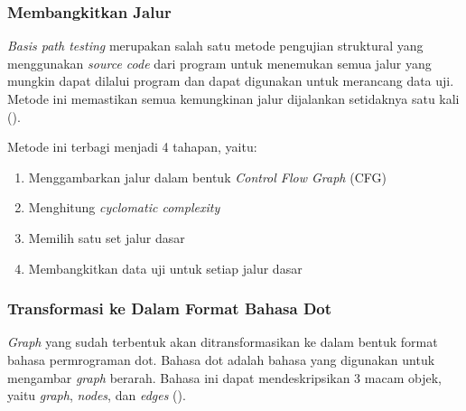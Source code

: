\subsubsection*{Membangkitkan Jalur}
\textit{Basis path testing} merupakan salah satu metode pengujian struktural yang menggunakan \textit{source code} dari program untuk menemukan semua jalur yang mungkin dapat dilalui program dan dapat digunakan untuk merancang data uji. Metode ini memastikan semua kemungkinan jalur dijalankan setidaknya satu kali (\cite{BASU2015}). 

Metode ini terbagi menjadi 4 tahapan, yaitu:
\begin{enumerate}[noitemsep] 
	\item Menggambarkan jalur dalam bentuk \textit{ Control Flow Graph} (CFG)
	\item Menghitung \textit{cyclomatic complexity}
	\item Memilih satu set jalur dasar
	\item Membangkitkan data uji untuk setiap jalur dasar
\end{enumerate}


\subsubsection*{Transformasi ke Dalam Format Bahasa Dot}
\textit{Graph} yang sudah terbentuk akan ditransformasikan ke dalam bentuk format bahasa permrograman dot. Bahasa dot adalah bahasa yang digunakan untuk mengambar \textit{graph} berarah. Bahasa ini dapat mendeskripsikan 3 macam objek, yaitu \textit{graph}, \textit{nodes}, dan \textit{edges} (\cite{GANSNER2015}).

